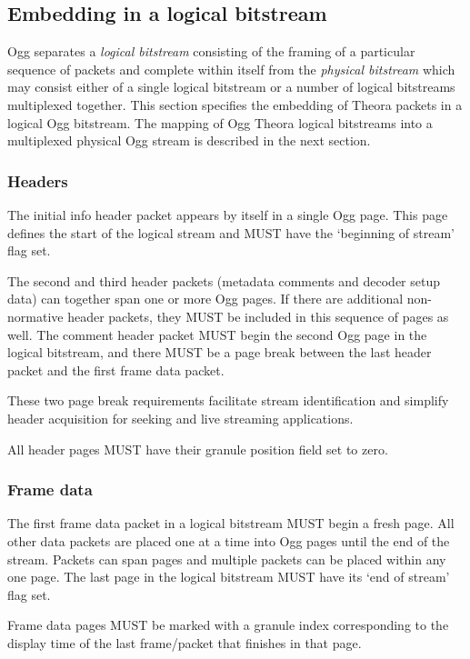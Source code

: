 \documentclass[11pt,letterpaper]{article}
\begin{document}
\subsection{Embedding in a logical bitstream}

Ogg separates a {\em logical bitstream} consisting of the framing of
 a particular sequence of packets and complete within itself from
 the {\em physical bitstream} which may consist either of a single
 logical bitstream or a number of logical bitstreams multiplexed
 together.
This section specifies the embedding of Theora packets in a logical Ogg
 bitstream.
The mapping of Ogg Theora logical bitstreams into a multiplexed physical Ogg
 stream is described in the next section.

\subsubsection{Headers}

The initial info header packet appears by itself in a single Ogg page.
This page defines the start of the logical stream and MUST have
 the `beginning of stream' flag set.

The second and third header packets (metadata comments and decoder
 setup data) can together span one or more Ogg pages.
If there are additional non-normative header packets, they MUST be
 included in this sequence of pages as well.
The comment header packet MUST begin the second Ogg page in the logical
 bitstream, and there MUST be a page break between the last header
 packet and the first frame data packet.

These two page break requirements facilitate stream identification and
 simplify header acquisition for seeking and live streaming applications.

All header pages MUST have their granule position field set to zero.

\subsubsection{Frame data}

The first frame data packet in a logical bitstream MUST begin a fresh page.
All other data packets are placed one at a time into Ogg pages
 until the end of the stream.
Packets can span pages and multiple packets can be placed within any
 one page.
The last page in the logical bitstream MUST have its `end of stream'
 flag set.

Frame data pages MUST be marked with a granule index corresponding to
 the display time of the last frame/packet that finishes in that page.
\end{document}
